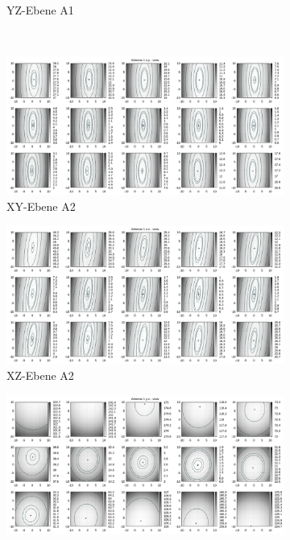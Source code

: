 \begin{appendix}
\begin{landscape}
\begin{figure}[!ht]
\begin{subfigure}[t]{0.5\textheight}
				\caption{YZ-Ebene A1}
	\end{subfigure}
\\
	\centering
	\begin{subfigure}[t]{0.5\textwidth}
	     \centering
	     \includegraphics[width=\textwidth]{img/fitness/xy/a1.png}
	             \caption{XY-Ebene A2}
	\end{subfigure}
	\begin{subfigure}[t]{0.5\textwidth}
		\centering
	     \includegraphics[width=\textwidth]{img/fitness/xz/a1.png}
	             \caption{XZ-Ebene A2}
	\end{subfigure}
	\begin{subfigure}[t]{0.5\textwidth}
			\centering
	   \includegraphics[width=\textwidth]{img/fitness/yz/a1.png}

\end{subfigure}
\end{figure}
\end{landscape}
\end{appendix}
